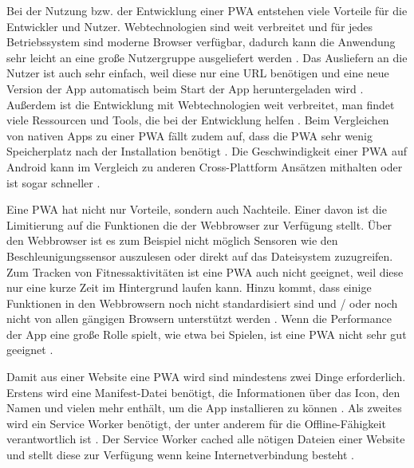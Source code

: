 Bei der Nutzung bzw. der Entwicklung einer \ac{PWA} entstehen viele Vorteile für die Entwickler und Nutzer. Webtechnologien sind weit verbreitet und für jedes Betriebssystem sind moderne Browser verfügbar, dadurch kann die Anwendung sehr leicht an eine große Nutzergruppe ausgeliefert werden \autocite{Rojas2020}. Das Ausliefern an die Nutzer ist auch sehr einfach, weil diese nur eine URL benötigen \autocite{KHAN2019289} und eine neue Version der App automatisch beim Start der App heruntergeladen wird \autocite{Rojas2020}. Außerdem ist die Entwicklung mit Webtechnologien weit verbreitet, man findet viele Ressourcen und Tools, die bei der Entwicklung helfen \autocite{Rojas2020}. Beim Vergleichen von nativen Apps zu einer \ac{PWA} fällt zudem auf, dass die \ac{PWA} sehr wenig Speicherplatz nach der Installation benötigt \autocite{biorn2017} \autocite{KHAN2019289}. Die Geschwindigkeit einer \ac{PWA} auf Android kann im Vergleich zu anderen Cross-Plattform Ansätzen mithalten oder ist sogar schneller \autocite{biorn2017}.

Eine \ac{PWA} hat nicht nur Vorteile, sondern auch Nachteile. Einer davon ist die Limitierung auf die Funktionen die der Webbrowser zur Verfügung stellt. Über den Webbrowser ist es zum Beispiel nicht möglich Sensoren wie den Beschleunigungssensor auszulesen oder direkt auf das Dateisystem zuzugreifen. Zum Tracken von Fitnessaktivitäten ist eine \ac{PWA} auch nicht geeignet, weil diese nur eine kurze Zeit im Hintergrund laufen kann. Hinzu kommt, dass einige Funktionen in den Webbrowsern noch nicht standardisiert sind und / oder noch nicht von allen gängigen Browsern unterstützt werden \autocite{majchrzak2018} \autocite{biorn2017}. Wenn die Performance der App eine große Rolle spielt, wie etwa bei Spielen, ist eine \ac{PWA} nicht sehr gut geeignet \autocite{biorn2017}.

Damit aus einer Website eine \ac{PWA} wird sind mindestens zwei Dinge erforderlich. Erstens wird eine Manifest-Datei benötigt, die Informationen über das Icon, den Namen und vielen mehr enthält, um die App installieren zu können \autocite{Hajian2019} \autocite{Rojas2020}. Als zweites wird ein Service Worker benötigt, der unter anderem für die Offline-Fähigkeit verantwortlich ist \autocite{Rojas2020}. Der Service Worker cached alle nötigen Dateien einer Website und stellt diese zur Verfügung wenn keine Internetverbindung besteht \autocite{Rojas2020}.


